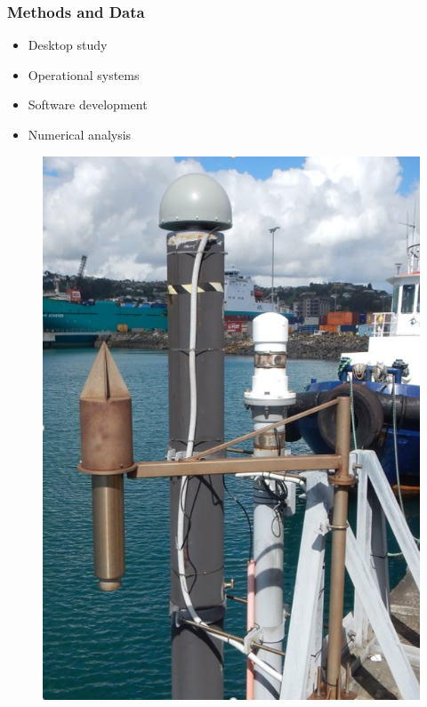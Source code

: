 \begin{frame}
\frametitle{Methods and Data}
\begin{minipage}{0.45\textwidth}
    \begin{itemize}
        \item Desktop study
        \item Operational systems
        \item Software development
        \item Numerical analysis
    \end{itemize}
\end{minipage}
\hfill
\begin{minipage}{0.45\textwidth}
    \begin{figure}      
    \includegraphics[width=\textwidth]{figures/images/tidegaugeEg.png}
    \end{figure}
\end{minipage}
\end{frame}
